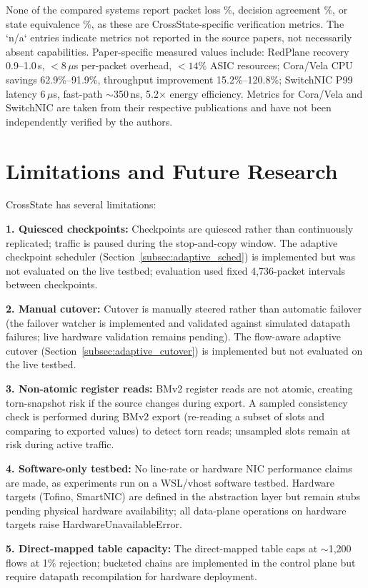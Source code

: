 \documentclass[10pt, conference]{IEEEtran}
\begin{document}
None of the compared systems report packet loss \%, decision agreement \%, or state equivalence \%, as these are CrossState-specific verification metrics. The `n/a` entries indicate metrics not reported in the source papers, not necessarily absent capabilities. Paper-specific measured values include: RedPlane recovery 0.9--1.0\,s, $<8\,\mu$s per-packet overhead, $<14\%$ ASIC resources; Cora/Vela CPU savings 62.9\%--91.9\%, throughput improvement 15.2\%--120.8\%; SwitchNIC P99 latency 6\,$\mu$s, fast-path $\sim$350\,ns, 5.2$\times$ energy efficiency. Metrics for Cora/Vela and SwitchNIC are taken from their respective publications and have not been independently verified by the authors.

\section{Limitations and Future Research}
\label{sec:limitations}
CrossState has several limitations:

\textbf{1. Quiesced checkpoints:} Checkpoints are quiesced rather than continuously replicated; traffic is paused during the stop-and-copy window. The adaptive checkpoint scheduler (Section~\ref{subsec:adaptive_sched}) is implemented but was not evaluated on the live testbed; evaluation used fixed 4{,}736-packet intervals between checkpoints.

\textbf{2. Manual cutover:} Cutover is manually steered rather than automatic failover (the failover watcher is implemented and validated against simulated datapath failures; live hardware validation remains pending). The flow-aware adaptive cutover (Section~\ref{subsec:adaptive_cutover}) is implemented but not evaluated on the live testbed.

\textbf{3. Non-atomic register reads:} BMv2 register reads are not atomic, creating torn-snapshot risk if the source changes during export. A sampled consistency check is performed during BMv2 export (re-reading a subset of slots and comparing to exported values) to detect torn reads; unsampled slots remain at risk during active traffic.

\textbf{4. Software-only testbed:} No line-rate or hardware NIC performance claims are made, as experiments run on a WSL/vhost software testbed. Hardware targets (Tofino, SmartNIC) are defined in the abstraction layer but remain stubs pending physical hardware availability; all data-plane operations on hardware targets raise HardwareUnavailableError.

\textbf{5. Direct-mapped table capacity:} The direct-mapped table caps at $\sim$1{,}200 flows at 1\% rejection; bucketed chains are implemented in the control plane but require datapath recompilation for hardware deployment.
\end{document}
